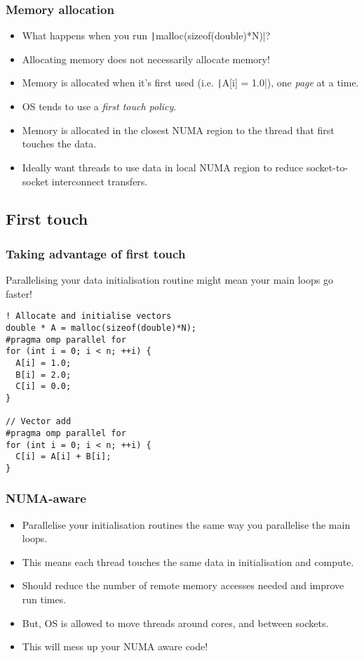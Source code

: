 \documentclass{beamer}
\begin{document}
\begin{frame}
\frametitle{Memory allocation}
\begin{itemize}
  \item What happens when you run \texttt|malloc(sizeof(double)*N)|?
  \pause
  \item Allocating memory does not necessarily allocate memory!
  \item Memory is allocated when it's first used (i.e. \texttt|A[i] = 1.0|), one \emph{page} at a time.
  \item OS tends to use a \emph{first touch policy}.
  \item Memory is allocated in the closest NUMA region to the thread that first touches the data.
  \item Ideally want threads to use data in local NUMA region to reduce socket-to-socket interconnect transfers.
\end{itemize}
\end{frame}

\subsection{First touch}
\begin{frame}[fragile]
\frametitle{Taking advantage of first touch}
Parallelising your data initialisation routine might mean your main loops go faster!


\begin{verbatim}
! Allocate and initialise vectors
double * A = malloc(sizeof(double)*N);
#pragma omp parallel for
for (int i = 0; i < n; ++i) {
  A[i] = 1.0;
  B[i] = 2.0;
  C[i] = 0.0;
}

// Vector add
#pragma omp parallel for
for (int i = 0; i < n; ++i) {
  C[i] = A[i] + B[i];
}
\end{verbatim}

\end{frame}

\begin{frame}
\frametitle{NUMA-aware}
\begin{itemize}
  \item Parallelise your initialisation routines the same way you parallelise the main loops.
  \item This means each thread touches the same data in initialisation and compute.
  \item Should reduce the number of remote memory accesses needed and improve run times.
  \item But, OS is allowed to move threads around cores, and between sockets.
  \item This will mess up your NUMA aware code!
\end{itemize}
\end{frame}
\end{document}
